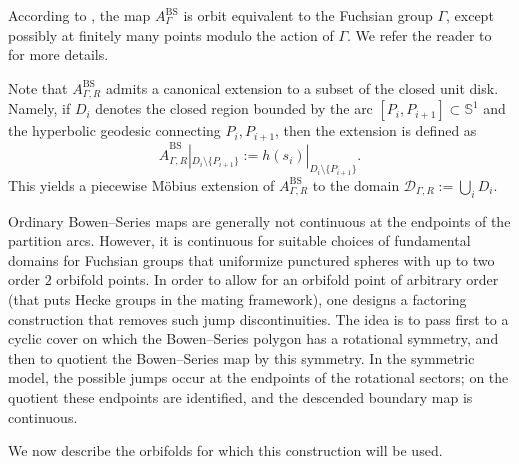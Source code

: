 \documentclass[11pt,a4paper, oneside]{amsart}
\theoremstyle{definition}
\theoremstyle{remark}
\numberwithin{equation}{section}
\begin{document}
\noindent According to \cite{BowenSeries79}, the map $A_{\Gamma}^{\mathrm{BS}}$ is orbit equivalent to the Fuchsian group $\Gamma$, except possibly at finitely many points	modulo the action of $\Gamma$. We refer the reader to \cite{BowenSeries79} for more details.

Note that $A_{\Gamma,R}^{\mathrm{BS}}$ admits a canonical extension to a subset of the closed unit disk. Namely, if $D_i$ denotes the closed region bounded by the arc $[P_i,P_{i+1}]\subset\mathbb S^1$ and the hyperbolic geodesic connecting $P_i, P_{i+1}$, then the extension is defined as 
$$
\widehat A_{\Gamma,R}^{\mathrm{BS}}|_{D_i\setminus\{P_{i+1}\}}:=h(s_i)|_{D_i\setminus\{P_{i+1}\}}.
$$ 
This yields a piecewise M\"obius extension of $A_{\Gamma,R}^{\mathrm{BS}}$ to the domain $\mathcal D_{\Gamma,R}:=\bigcup_i D_i$.

Ordinary Bowen--Series maps are generally not continuous at the endpoints of
the partition arcs. However, it is continuous for suitable choices of fundamental domains for Fuchsian groups that uniformize punctured spheres with up to two order $2$ orbifold points. In order to allow for an orbifold point of arbitrary order (that puts Hecke groups in the mating framework), one designs a factoring construction that
removes such jump discontinuities. The idea is to pass first to a
cyclic cover on which the Bowen--Series polygon has a rotational symmetry, and
then to quotient the Bowen--Series map by this symmetry.  In the symmetric
model, the possible jumps occur at the endpoints of the rotational sectors; on
the quotient these endpoints are identified, and the descended boundary map is
continuous.

We now describe the orbifolds for which this construction
will be used.
\end{document}
